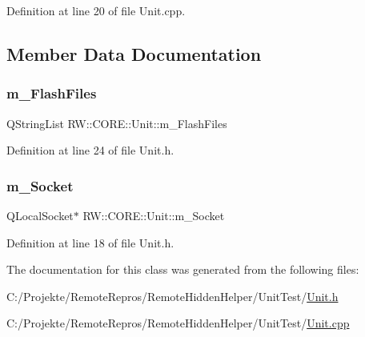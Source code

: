 Definition at line 20 of file Unit.\+cpp.



\subsection{Member Data Documentation}
\hypertarget{class_r_w_1_1_c_o_r_e_1_1_unit_a7e19e658c1f9cac1db592ac5d29151a2}{}\label{class_r_w_1_1_c_o_r_e_1_1_unit_a7e19e658c1f9cac1db592ac5d29151a2} 
\subsubsection{\texorpdfstring{m\+\_\+\+Flash\+Files}{m\_FlashFiles}}
{\footnotesize\ttfamily Q\+String\+List R\+W\+::\+C\+O\+R\+E\+::\+Unit\+::m\+\_\+\+Flash\+Files\hspace{0.3cm}{\ttfamily [private]}}



Definition at line 24 of file Unit.\+h.

\hypertarget{class_r_w_1_1_c_o_r_e_1_1_unit_a66126526b69f4c9f9559613e921bf724}{}\label{class_r_w_1_1_c_o_r_e_1_1_unit_a66126526b69f4c9f9559613e921bf724} 
\subsubsection{\texorpdfstring{m\+\_\+\+Socket}{m\_Socket}}
{\footnotesize\ttfamily Q\+Local\+Socket$\ast$ R\+W\+::\+C\+O\+R\+E\+::\+Unit\+::m\+\_\+\+Socket\hspace{0.3cm}{\ttfamily [private]}}



Definition at line 18 of file Unit.\+h.



The documentation for this class was generated from the following files\+:\begin{DoxyCompactItemize}
\item 
C\+:/\+Projekte/\+Remote\+Repros/\+Remote\+Hidden\+Helper/\+Unit\+Test/\hyperlink{_unit_8h}{Unit.\+h}\item 
C\+:/\+Projekte/\+Remote\+Repros/\+Remote\+Hidden\+Helper/\+Unit\+Test/\hyperlink{_unit_8cpp}{Unit.\+cpp}\end{DoxyCompactItemize}
